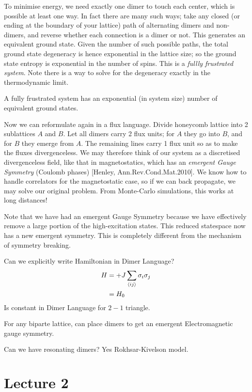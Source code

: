 \documentclass[a4paper]{article}
\begin{document}
To minimise energy, we need exactly one dimer to touch each center, which is
possible at least one way. In fact there are many such ways; take any
closed (or ending at the boundary of your lattice) path of alternating
dimers and non-dimers, and reverse whether each connection is a dimer or
not. This generates an equivalent ground state. Given the number of such
possible paths, the total ground state degeneracy is hence exponential in
the lattice size; so the ground state entropy is exponential in the number
of spins. This is a \emph{fullly frustrated system}. Note there is a way to
solve for the degeneracy exactly in the thermodynamic limit.

\begin{definition}
A fully frustrated system has an exponential (in system size) number of equivalent ground
states.
\end{definition}

Now we can reformulate again in a flux language. Divide honeycomb lattice into
2 sublattices $A$ and $B$. Let all dimers carry 2 flux units; for $A$ they go
into $B$, and for $B$ they emerge from $A$. The remaining lines carry 1 flux
unit so as to make the fluxes divergenceless. We may therefore think of our
system as a discretised divergenceless field, like that in magnetostatics, which
has an \emph{emergent Gauge Symmetry} (Coulomb phases) [Henley, Ann.Rev.Cond.Mat.2010]. We know how to handle
correlators for the magnetostatic case, so if we can back propagate, we may
solve our original problem. From Monte-Carlo simulations, this works at long distances!

Note that we have had an emergent Gauge Symmetry because we have effectively
remove a large portion of the high-excitation states. This reduced statespace
now has a new emergent symmetry. This is completely different from the
mechanism of symmetry breaking.

Can we explicitly write Hamiltonian in Dimer Language?
\begin{align*}
    H&=+J\sum_{\braket{ij}}\sigma_i\sigma_j\\
     &=H_0
\end{align*}
Is constant in Dimer Language for $2-1$ triangle.  

For any biparte lattice, can place dimers to get an emergent Electromagnetic
gauge symmetry. 

Can we have resonating dimers? Yes Rokhsar-Kivelson model.
\section{Lecture 2}
\end{document}
